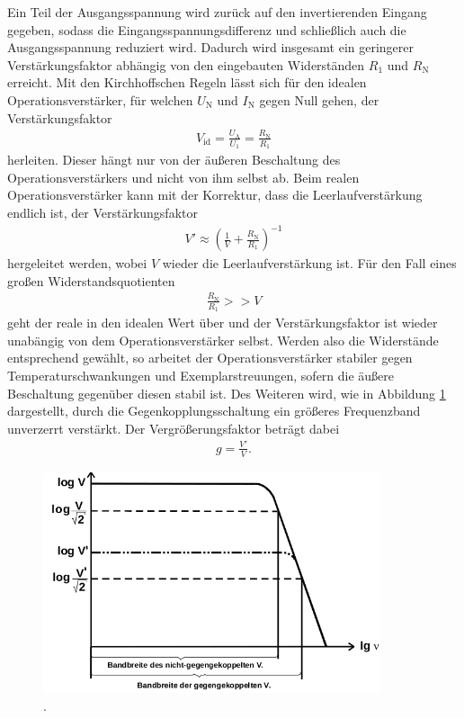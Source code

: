 Ein Teil der Ausgangsspannung wird zurück auf den invertierenden Eingang gegeben, sodass die Eingangsspannungsdifferenz
und schließlich auch die Ausgangsspannung reduziert wird. Dadurch wird insgesamt ein geringerer Verstärkungsfaktor abhängig von
den eingebauten Widerständen $R_1$ und $R_\text{N}$ erreicht. Mit den Kirchhoffschen Regeln lässt sich für den idealen
Operationsverstärker, für welchen $U_\text{N}$ und $I_\text{N}$ gegen Null gehen, der Verstärkungsfaktor
\begin{align}
  V_\text{id} = \frac{U_\text{A}}{U_\text{1}} = \frac{R_\text{N}}{R_1}
\end{align}
herleiten. Dieser hängt nur von der äußeren Beschaltung des Operationsverstärkers und nicht von ihm selbst ab.
Beim realen Operationsverstärker kann mit der Korrektur, dass die Leerlaufverstärkung endlich ist, der
Verstärkungsfaktor
\begin{align}
  V' \approx \left( \frac1{V} + \frac{R_\text{N}}{R_1} \right)^{-1}
\end{align}
hergeleitet werden, wobei $V$ wieder die Leerlaufverstärkung ist. Für den Fall eines großen Widerstandsquotienten
\begin{align}
  \frac{R_\text{N}}{R_1} >> V
\end{align}
geht der reale in den idealen Wert über und der Verstärkungsfaktor ist wieder unabängig von dem Operationsverstärker selbst.
Werden also die Widerstände entsprechend gewählt, so arbeitet der Operationsverstärker stabiler gegen Temperaturschwankungen
und Exemplarstreuungen, sofern die äußere Beschaltung gegenüber diesen stabil ist.
Des Weiteren wird, wie in Abbildung \ref{fig:frequenzband} dargestellt, durch die Gegenkopplungsschaltung ein größeres Frequenzband unverzerrt verstärkt.
Der Vergrößerungsfaktor beträgt dabei
\begin{align}
  g = \frac{V'}{V}.
\end{align}

\begin{figure}
  \centering
  \includegraphics[height=6.5cm]{ImmerDieseNorweger/frequenzband.png}
  \caption{\cite{anleitung}.}
  \label{fig:frequenzband}
\end{figure}

